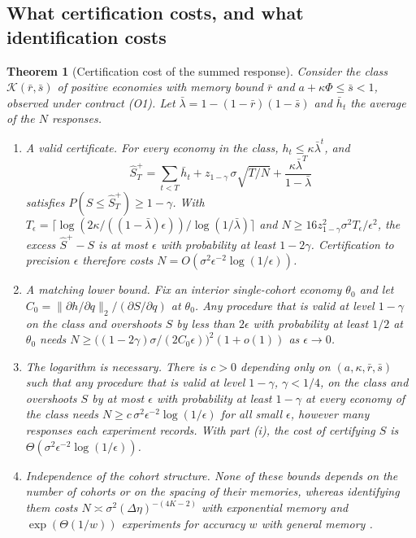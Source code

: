 \documentclass[12pt]{article}
\newtheorem{theorem}{Theorem}[section]
\theoremstyle{definition}
\theoremstyle{remark}
\begin{document}
\subsection{What certification costs, and what identification costs}

\begin{theorem}[Certification cost of the summed response]\label{thm:certcost}
Consider the class $\mathcal K(\bar r,\bar s)$ of positive economies with memory bound $\bar r$ and $a+\kappa\Phi\le\bar s<1$, observed under contract (O1). Let $\bar\lambda=1-(1-\bar r)(1-\bar s)$ and $\bar h_t$ the average of the $N$ responses.
\begin{enumerate}[label=(\roman*)]
\item \emph{A valid certificate.} For every economy in the class, $h_t\le\kappa\bar\lambda^t$, and
\[
\hat S^+_T=\sum_{t<T}\bar h_t+z_{1-\gamma}\,\sigma\sqrt{T/N}+\frac{\kappa\bar\lambda^T}{1-\bar\lambda}
\]
satisfies $P(S\le\hat S^+_T)\ge1-\gamma$. With $T_\epsilon=\lceil\log(2\kappa/((1-\bar\lambda)\epsilon))/\log(1/\bar\lambda)\rceil$ and $N\ge16z_{1-\gamma}^2\sigma^2T_\epsilon/\epsilon^2$, the excess $\hat S^+-S$ is at most $\epsilon$ with probability at least $1-2\gamma$. Certification to precision $\epsilon$ therefore costs $N=O(\sigma^2\epsilon^{-2}\log(1/\epsilon))$.
\item \emph{A matching lower bound.} Fix an interior single-cohort economy $\theta_0$ and let $C_0=\|\partial h/\partial q\|_2/(\partial S/\partial q)$ at $\theta_0$. Any procedure that is valid at level $1-\gamma$ on the class and overshoots $S$ by less than $2\epsilon$ with probability at least $1/2$ at $\theta_0$ needs $N\ge\bigl((1-2\gamma)\sigma/(2C_0\epsilon)\bigr)^2(1+o(1))$ as $\epsilon\to0$.
\item \emph{The logarithm is necessary.} There is $c>0$ depending only on $(a,\kappa,\bar r,\bar s)$ such that any procedure that is valid at level $1-\gamma$, $\gamma<1/4$, on the class and overshoots $S$ by at most $\epsilon$ with probability at least $1-\gamma$ at every economy of the class needs $N\ge c\,\sigma^2\epsilon^{-2}\log(1/\epsilon)$ for all small $\epsilon$, however many responses each experiment records. With part (i), the cost of certifying $S$ is $\Theta(\sigma^2\epsilon^{-2}\log(1/\epsilon))$.
\item \emph{Independence of the cohort structure.} None of these bounds depends on the number of cohorts or on the spacing of their memories, whereas identifying them costs $N\asymp\sigma^2(\Delta\eta)^{-(4K-2)}$ with exponential memory and $\exp(\Theta(1/w))$ experiments for accuracy $w$ with general memory \citep{niroula2026}.
\end{enumerate}
\end{theorem}
\end{document}
